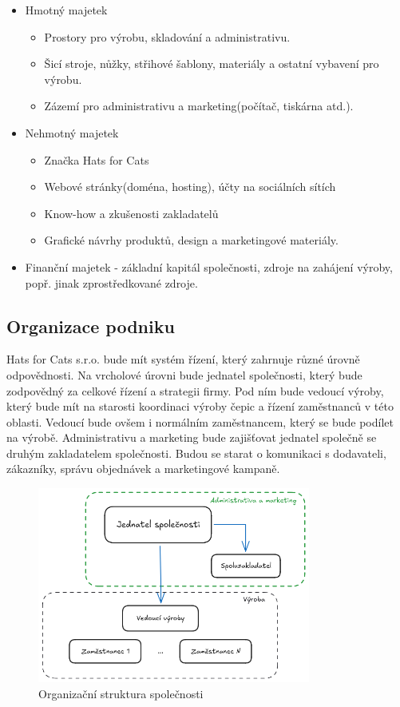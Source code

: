 \documentclass[12pt, a4paper]{article}
\begin{document}
\begin{itemize}
  \item Hmotný majetek
  \begin{itemize}
    \item Prostory pro výrobu, skladování a administrativu.
    \item Šicí stroje, nůžky, střihové šablony, materiály a ostatní vybavení pro výrobu.
    \item Zázemí pro administrativu a marketing(počítač, tiskárna atd.).
  \end{itemize}
  \item Nehmotný majetek
  \begin{itemize}
    \item Značka Hats for Cats
    \item Webové stránky(doména, hosting), účty na sociálních sítích
    \item Know-how a zkušenosti zakladatelů
    \item Grafické návrhy produktů, design a marketingové materiály.
  \end{itemize}
  \item{Finanční majetek} - základní kapitál společnosti, zdroje na zahájení výroby, popř. jinak zprostředkované zdroje.
\end{itemize}

\pagebreak

\subsection{Organizace podniku}

Hats for Cats s.r.o. bude mít systém řízení, který zahrnuje různé úrovně odpovědnosti.
Na vrcholové úrovni bude jednatel společnosti, který bude zodpovědný za celkové řízení a strategii firmy.
Pod ním bude vedoucí výroby, který bude mít na starosti koordinaci výroby čepic a řízení zaměstnanců v této oblasti.
Vedoucí bude ovšem i normálním zaměstnancem, který se bude podílet na výrobě.
Administrativu a marketing bude zajišťovat jednatel společně se druhým zakladatelem společnosti.
Budou se starat o komunikaci s dodavateli, zákazníky, správu objednávek a marketingové kampaně.

\vspace{10pt}

\begin{figure}[h]
  \centering
  \includegraphics[width=0.8\textwidth]{files/obr1.png}
  \caption{Organizační struktura společnosti}
\end{figure}
\end{document}

